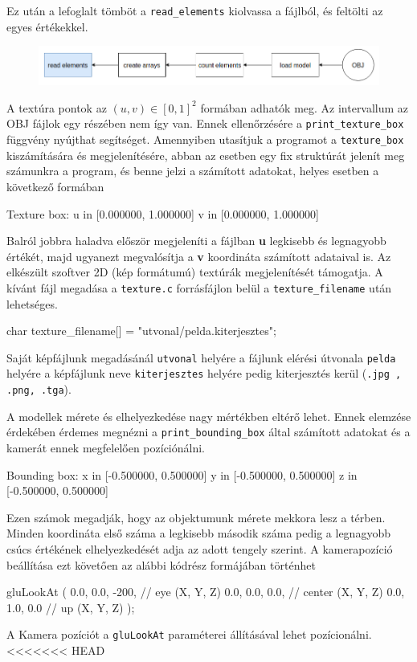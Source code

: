 Ez után a lefoglalt tömböt a \texttt{read\_elements} kiolvassa a fájlból, és feltölti az egyes értékekkel.
\begin{figure}[h!]
\centering
\includegraphics[scale=0.5]{images/read.png}
\end{figure}

\newpage


A textúra pontok az $(u, v) \in [0, 1]^2$ formában adhatók meg. Az intervallum az OBJ fájlok egy részében nem így van. Ennek ellenőrzésére a  \texttt{print\_texture\_box} függvény nyújthat segítséget. Amennyiben utasítjuk a programot  a \texttt{texture\_box} kiszámítására és megjelenítésére, abban az esetben egy fix struktúrát jelenít meg számunkra a program, és benne jelzi a számított adatokat, helyes esetben a következő formában
\begin{python}
Texture box:
u in [0.000000, 1.000000]
v in [0.000000, 1.000000]
\end{python}
\bigskip
Balról jobbra haladva először megjeleníti a fájlban \textbf{u} legkisebb és legnagyobb értékét, majd ugyanezt megvalósítja a \textbf{v} koordináta számított adataival is.
Az elkészült szoftver 2D (kép formátumú) textúrák megjelenítését támogatja. A kívánt fájl megadása a \texttt{texture.c} forrásfájlon belül a \texttt{texture\_filename} után lehetséges.
\begin{cpp}
char texture_filename[] = "utvonal/pelda.kiterjesztes";
\end{cpp}
Saját képfájlunk megadásánál \texttt{utvonal} helyére a fájlunk elérési útvonala \texttt{pelda} helyére a képfájlunk neve \texttt{kiterjesztes} helyére pedig kiterjesztés kerül (\texttt{.jpg , .png, .tga}).


A modellek mérete és elhelyezkedése nagy mértékben eltérő lehet. Ennek elemzése érdekében érdemes megnézni a \texttt{print\_bounding\_box} által számított adatokat és a kamerát ennek megfelelően pozíciónálni.
\bigskip
\begin{python}
Bounding box:
x in [-0.500000, 0.500000]
y in [-0.500000, 0.500000]
z in [-0.500000, 0.500000]
\end{python}
\bigskip
Ezen számok megadják, hogy az objektumunk mérete mekkora lesz a térben. Minden koordináta első száma a legkisebb második száma pedig a legnagyobb csúcs értékének elhelyezkedését adja az adott tengely szerint.
A kamerapozíció beállítása ezt követően az alábbi kódrész formájában történhet
\begin{cpp}
gluLookAt
(
    0.0, 0.0, -200, // eye (X, Y, Z)
    0.0, 0.0, 0.0,  // center (X, Y, Z)
    0.0, 1.0, 0.0   // up (X, Y, Z)
);
\end{cpp}
A Kamera pozíciót a \texttt{gluLookAt} paraméterei állításával lehet pozícionálni.
<<<<<<< HEAD

